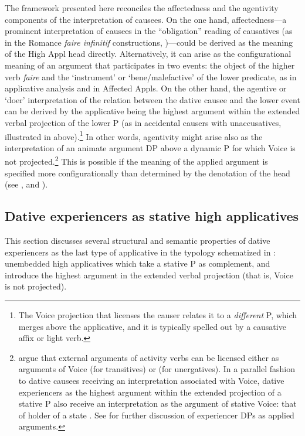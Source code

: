 \documentclass[output=paper,colorlinks,citecolor=brown,nonflat]{./langscibook}
\begin{document}
The framework presented here reconciles the affectedness and the agentivity components of the interpretation of causees. On the one hand, affectedness—a prominent interpretation of causees in the “obligation” reading of causatives (as in the Romance \textit{faire infinitif} constructions, \citealt{FolliHarley2007})—could be derived as the meaning of the High Appl head directly. Alternatively, it can arise as the configurational meaning of an argument that participates in two events: the object of the higher verb \textit{faire} and the ‘instrument’ or ‘bene/malefactive’ of the lower predicate, as in  applicative analysis and in Affected Appls. On the other hand, the agentive or ‘doer’ interpretation of the relation between the dative causee and the lower event can be derived by the applicative being the highest argument within the extended verbal projection of the lower \liv P (as in accidental causers with unaccusatives, illustrated in  above).\footnote{The Voice projection that licenses the causer relates it to a \textit{different} \liv P, which merges above the applicative, and it is typically spelled out by a causative affix or light verb.} In other words, agentivity might arise also as the interpretation of an animate argument DP above a dynamic \liv P for which Voice is not projected.\footnote{\citet{TollanOxford2018} argue that external arguments of activity verbs can be licensed either as arguments of Voice (for transitives) or \liv (for unergatives). In a parallel fashion to dative causees receiving an interpretation associated with Voice, dative experiencers as the highest argument within the extended projection of a stative \liv P also receive an interpretation as the argument of stative Voice: that of holder of a state \citep{Kratzer1996}. See  for further discussion of experiencer DPs as applied arguments.} This is possible if the meaning of the applied argument is specified more configurationally than determined by the denotation of the head (see \citealt{Cuervo2015Chapter}, and \citealt{WoodMarantz2017}). 

\subsection{Dative experiencers as stative high applicatives}\label{sec:cuervo:4.4}

This section discusses several structural and semantic properties of dative experiencers as the last type of applicative in the typology schematized in : unembedded high applicatives which take a stative \liv P as complement, and introduce the highest argument in the extended verbal projection (that is, Voice is not projected). 
\end{document}

